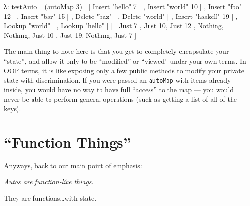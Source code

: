 \documentclass[]{article}
\newenvironment{Shaded}{}{}
\newcommand{\DataTypeTok}[1]{\textcolor[rgb]{0.56,0.13,0.00}{{#1}}}
\newcommand{\DecValTok}[1]{\textcolor[rgb]{0.25,0.63,0.44}{{#1}}}
\newcommand{\StringTok}[1]{\textcolor[rgb]{0.25,0.44,0.63}{{#1}}}
\newcommand{\FunctionTok}[1]{\textcolor[rgb]{0.02,0.16,0.49}{{#1}}}
\newcommand{\NormalTok}[1]{{#1}}
\begin{document}
\begin{Shaded}
\begin{Highlighting}[]
\NormalTok{λ}\FunctionTok{:} \NormalTok{testAuto_ (autoMap }\DecValTok{3}\NormalTok{)}
  \FunctionTok{|}  \NormalTok{[ }\DataTypeTok{Insert} \StringTok{"hello"} \DecValTok{7}
  \FunctionTok{|}  \NormalTok{, }\DataTypeTok{Insert} \StringTok{"world"} \DecValTok{10}
  \FunctionTok{|}  \NormalTok{, }\DataTypeTok{Insert} \StringTok{"foo"} \DecValTok{12}
  \FunctionTok{|}  \NormalTok{, }\DataTypeTok{Insert} \StringTok{"bar"} \DecValTok{15}
  \FunctionTok{|}  \NormalTok{, }\DataTypeTok{Delete} \StringTok{"baz"}
  \FunctionTok{|}  \NormalTok{, }\DataTypeTok{Delete} \StringTok{"world"}
  \FunctionTok{|}  \NormalTok{, }\DataTypeTok{Insert} \StringTok{"haskell"} \DecValTok{19}
  \FunctionTok{|}  \NormalTok{, }\DataTypeTok{Lookup} \StringTok{"world"}
  \FunctionTok{|}  \NormalTok{, }\DataTypeTok{Lookup} \StringTok{"hello"}
  \FunctionTok{|}  \NormalTok{]}
\NormalTok{[ }\DataTypeTok{Just} \DecValTok{7} \NormalTok{, }\DataTypeTok{Just} \DecValTok{10}\NormalTok{, }\DataTypeTok{Just} \DecValTok{12}
\NormalTok{, }\DataTypeTok{Nothing}\NormalTok{, }\DataTypeTok{Nothing}\NormalTok{, }\DataTypeTok{Just} \DecValTok{10}
\NormalTok{, }\DataTypeTok{Just} \DecValTok{19}\NormalTok{, }\DataTypeTok{Nothing}\NormalTok{, }\DataTypeTok{Just} \DecValTok{7}  \NormalTok{]}
\end{Highlighting}
\end{Shaded}

The main thing to note here is that you get to completely encapsulate your ``state'', and allow it
only to be ``modified'' or ``viewed'' under your own terms. In OOP terms, it is like exposing only a
few public methods to modify your private state with discrimination. If you were passed an
\texttt{autoMap} with items already inside, you would have no way to have full ``access'' to the map
--- you would never be able to perform general operations (such as getting a list of all of the
keys).

\section{\texorpdfstring{``Function Things''}{Function Things}}\label{function-things}

Anyways, back to our main point of emphasis:

\emph{Autos are function-like things}.

They are functions\ldots{}with state.
\end{document}
